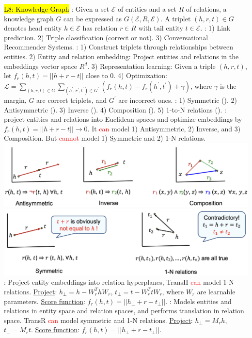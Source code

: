 \hl{L8: Knowledge Graph}
: Given a set $\mathcal{E}$ of entities and a set $R$ of relations, a knowledge graph $G$ can be expressed as $G(\mathcal{E}, R, \mathcal{E})$. A triplet  $(h,r,t) \in G$ denotes head entity $h\in \mathcal{E}$ has relation $r \in R$ with tail entity $t\in \mathcal{E}$.
: 1) Link prediction. 2) Triple classification (\ie correct or not). 3) Conversational Recommender Systems.
:
1) Construct triplets through relationships between entities.
2) Entity and relation embedding: Project entities and relations in the embeddings vector space $R^d$.
3) Representation learning: Given a triple $(h,r,t)$, let $f_r(h,t)=||h+r-t||$ close to 0.
4) Optimization: $\mathcal{L}=\sum_{(h,r,t) \in G}\sum_{(h^\prime,r^\prime,t^\prime) \in G^\prime} (f_r(h,t) - f_r(h^\prime,t^\prime) + \gamma)$, where $\gamma$ is the margin, $G$ are correct triplets, and $G^\prime$ are incorrect ones.
: 1) Symmetric (\eg {}). 2) Antisymmetric (\eg {}). 3) Inverse (\eg {}). 4) Composition (\eg {}). 5) 1-to-N relations (\eg {}).
: project entities and relations into Euclidean spaces and optimize embeddings by $f_r(h,t)=||h+r-t|| \rightarrow 0$. It \textcolor{red}{can} model 1) Antisymmetric, 2) Inverse, and 3) Composition. But \textcolor{red}{cannot} model 1) Symmetric and 2) 1-N relations.
\includegraphics[height=0.05\textwidth]{figs/TransE.png}
\includegraphics[height=0.05\textwidth]{figs/TransE2.png}
: Project entity embeddings into relation hyperplanes, TransH \textcolor{red}{can} model 1-N relations. \underline{Project}: $h_\perp=h-W^T_rhW_r$, $t_\perp=t-W^T_rtW_r$, where $W_r$ are learnable parameters. \underline{Score function}: $f_r(h,t)=||h_\perp+r-t_\perp||$.
: Models entities and relations in entity space and relation spaces, and performs translation in relation space. TransR \textcolor{red}{can} model symmetric and 1-N relations. \underline{Project}: $h_\perp=M_rh$, $t_\perp=M_rt$. \underline{Score function}: $f_r(h,t)=||h_\perp+r-t_\perp||$.
